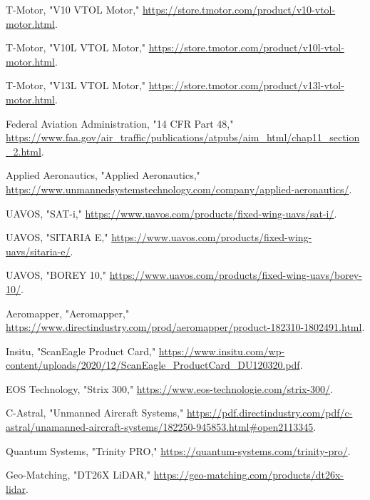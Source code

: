 \documentclass[12pt]{report}
\begin{document}
			\begin{thebibliography}{99}
				
				T-Motor, "V10 VTOL Motor," \url{https://store.tmotor.com/product/v10-vtol-motor.html}.
				
				T-Motor, "V10L VTOL Motor," \url{https://store.tmotor.com/product/v10l-vtol-motor.html}.
				
				T-Motor, "V13L VTOL Motor," \url{https://store.tmotor.com/product/v13l-vtol-motor.html}.
								
				Federal Aviation Administration, "14 CFR Part 48," \url{https://www.faa.gov/air_traffic/publications/atpubs/aim_html/chap11_section_2.html}.
				
				Applied Aeronautics, "Applied Aeronautics," \url{https://www.unmannedsystemstechnology.com/company/applied-aeronautics/}.
				
				UAVOS, "SAT-i," \url{https://www.uavos.com/products/fixed-wing-uavs/sat-i/}.
				
				UAVOS, "SITARIA E," \url{https://www.uavos.com/products/fixed-wing-uavs/sitaria-e/}.
				
				UAVOS, "BOREY 10," \url{https://www.uavos.com/products/fixed-wing-uavs/borey-10/}.
				
				Aeromapper, "Aeromapper," \url{https://www.directindustry.com/prod/aeromapper/product-182310-1802491.html}.
				
				Insitu, "ScanEagle Product Card," \url{https://www.insitu.com/wp-content/uploads/2020/12/ScanEagle_ProductCard_DU120320.pdf}.
				
				EOS Technology, "Strix 300," \url{https://www.eos-technologie.com/strix-300/}.
				
				C-Astral, "Unmanned Aircraft Systems," \url{https://pdf.directindustry.com/pdf/c-astral/unamanned-aircraft-systems/182250-945853.html#open2113345}.
				
				Quantum Systems, "Trinity PRO," \url{https://quantum-systems.com/trinity-pro/}.
				
				Geo-Matching, "DT26X LiDAR," \url{https://geo-matching.com/products/dt26x-lidar}.
				

\end{thebibliography}
\end{document}
